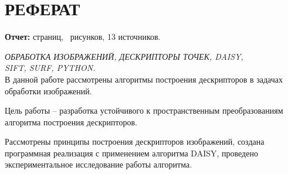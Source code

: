
\def\l@subsection{\@dottedtocline{2}{3.8em}{3.2em}}
\setcounter{tocdepth}{2}



\newcommand{\incpic}[3]{
	\begin{figure}[H] 
		\begin{center} 
			\texttt{[image: \#1]} 
			\caption{#2}
			\label{#3} 
		\end{center}
	\end{figure} 
}




\setcounter{page}{3}
\setcounter{secnumdepth}{3}

\section*{РЕФЕРАТ}
{
	{\bf Отчет:}
	\pageref{LastPage} страниц,
	\totalfigures\ рисунков,
	13 источников.
	
	
	\textit{ОБРАБОТКА ИЗОБРАЖЕНИЙ, ДЕСКРИПТОРЫ ТОЧЕК, DAISY, \\SIFT, SURF, PYTHON.}\\
	
	В данной работе рассмотрены алгоритмы построения дескрипторов в задачах обработки изображений.
	
	Цель работы -- разработка устойчивого к пространственным преобразованиям алгоритма построения дескрипторов.
	
	Рассмотрены принципы построения дескрипторов изображений, создана программная реализация с применением алгоритма DAISY, проведено экспериментальное исследование работы алгоритма.
}
\newpage

\newpage
\tableofcontents


